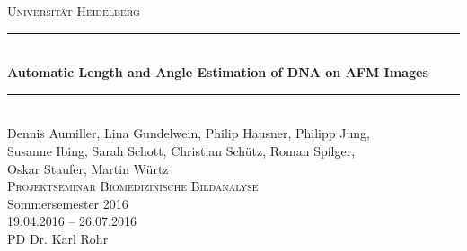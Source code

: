 \begin{titlepage}

\newcommand{\HRule}{\rule{\linewidth}{0.5mm}} %

\center %
 


\textsc{\LARGE Universität Heidelberg}\\[1.5cm] %


\HRule \\[0.4cm]
{ \huge \bfseries Automatic Length and Angle Estimation of DNA on AFM Images}\\[0.4cm] %
\HRule \\[1cm]
 


Dennis Aumiller, Lina Gundelwein, Philip Hausner, Philipp Jung, \\Susanne Ibing, Sarah Schott, Christian Schütz, Roman Spilger,\\ Oskar Staufer, Martin Würtz \\[3cm]%

\textsc{\Large Projektseminar Biomedizinische Bildanalyse}\\ %
\large Sommersemester 2016\\%
19.04.2016 -- 26.07.2016\\
PD Dr. Karl Rohr\\[2em]



\end{titlepage}
